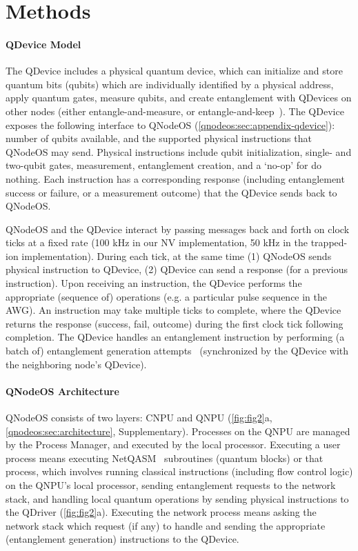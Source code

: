 \section{Methods}
\label{qnodeos:sec:methods}

\paragraph{QDevice Model}

The QDevice includes a physical quantum device, which can initialize and store quantum bits (qubits) which are individually identified by a physical address, apply quantum gates, measure qubits, and create entanglement with QDevices on other nodes (either entangle-and-measure, or entangle-and-keep~\cite{dahlberg_2019_egp}). The QDevice exposes the following interface to QNodeOS (\cref{qnodeos:sec:appendix-qdevice}): number of qubits available, and the supported physical instructions that QNodeOS may send. Physical instructions include qubit initialization, single- and two-qubit gates, measurement, entanglement creation, and a `no-op' for do nothing. Each instruction has a corresponding response (including entanglement success or failure, or a measurement outcome) that the QDevice sends back to QNodeOS.

QNodeOS and the QDevice interact by passing messages back and forth on clock ticks at a fixed rate (100 kHz in our NV implementation, 50 kHz in the trapped-ion implementation). During each tick, at the same time (1) QNodeOS sends physical instruction to QDevice, (2) QDevice can send a response (for a previous instruction). Upon receiving an instruction, the QDevice performs the appropriate (sequence of) operations (e.g. a particular pulse sequence in the AWG). An instruction may take multiple ticks to complete, where the QDevice returns the response (success, fail, outcome) during the first clock tick following completion. The QDevice handles an entanglement instruction by performing (a batch of) entanglement generation attempts~\cite{pompili_2022_experimental} (synchronized by the QDevice with the neighboring node's QDevice). 

\paragraph{QNodeOS Architecture}

QNodeOS consists of two layers: CNPU and QNPU (\cref{fig:fig2}a, \cref{qnodeos:sec:architecture}, Supplementary). Processes on the QNPU are managed by the Process Manager, and executed by the local processor. Executing a user process means executing NetQASM~\cite{dahlberg_2022_netqasm} subroutines (quantum blocks) or that process, which involves running classical instructions (including flow control logic) on the QNPU's local processor, sending entanglement requests to the network stack, and handling local quantum operations by sending physical instructions to the QDriver (\cref{fig:fig2}a). Executing the network process means asking the network stack which request (if any) to handle and sending the appropriate (entanglement generation) instructions to the QDevice. 

